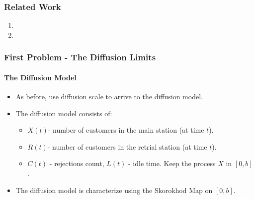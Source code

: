 \documentclass{beamer}
\begin{document}
\begin{frame}
  \frametitle{Related Work}

\begin{enumerate}
\item {}
\item {}
\end{enumerate}



\end{frame}

\begin{frame}
  \frametitle{First Problem - The Diffusion Limits}
  \framesubtitle{The Diffusion Model}

  \vfill
  \begin{itemize}[<+->]
  \item As before, use diffusion scale to arrive to the diffusion model.
    \vfill
  \item The diffusion model consists of:
    \begin{itemize}
    \item $X(t)$- number of customers in the main station (at time $t$).\\
    \item $R(t)$- number of customers in the retrial station (at time $t$).\\
    \item $C(t)$ - rejections count, $L(t)$ - idle time. Keep the process $X$ in $[0,b]$.
    \end{itemize}
    \vfill

  \item The diffusion model is characterize using the Skorokhod Map on $[0,b]$. 
  \end{itemize}
  \vfill

\end{frame}
\end{document}
